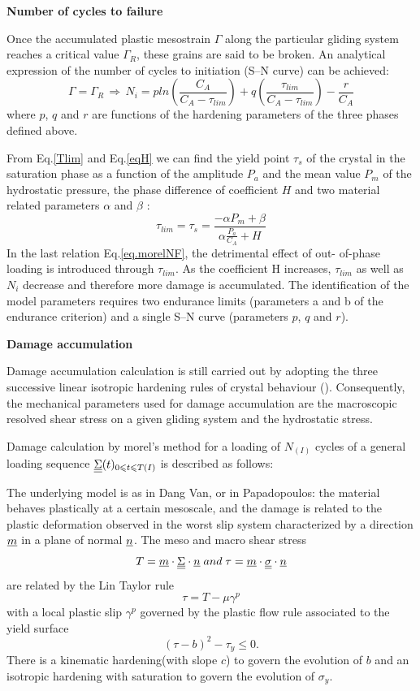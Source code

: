 \textbf{Number of cycles to failure}

Once the accumulated plastic mesostrain $\Gamma$ along the particular gliding system reaches a critical value $\Gamma_R$, these grains are said to be broken. An analytical expression of the number
of cycles to initiation (S–N curve) can be achieved:
\begin{equation}
\Gamma=\Gamma_R \, \Rightarrow \, N_i=pln\left(\frac{C_A}{C_A-\tau_{lim}}\right)+q\left(\frac{\tau_{lim}}{C_A-\tau_{lim}}\right)-\frac{r}{C_A}
\label{eq.morelNF}
\end{equation}
where $p$, $q$ and $r$ are functions of the hardening parameters of the three phases defined above.

From Eq.\eqref{Tlim} and Eq.\eqref{eqH} we can find the yield point $\tau_s$ of the crystal in the saturation phase as a function of the amplitude $P_a$ and the mean value $P_m$ of the hydrostatic pressure, the phase difference of coefficient $H$ and two material related parameters $\alpha$ and $\beta$ :
\begin{equation}
\tau_{lim}=\tau_s=\frac{-\alpha P_m+\beta}{\alpha\frac{P_a}{C_A}+H}
\label{taus}
\end{equation}
In the last relation Eq.\ref{eq.morelNF}, the detrimental effect of out-
of-phase loading is introduced through $\tau_{lim}$. As the coefficient H increases, $\tau_{lim}$ as well as $N_i$ decrease and therefore more damage is accumulated. The identification of
the model parameters requires two endurance limits
(parameters a and b of the endurance criterion) and a
single S–N curve (parameters $p$, $q$ and $r$).

\textbf{Damage accumulation}

Damage accumulation calculation is still carried out
by adopting the three successive linear isotropic hardening rules of crystal behaviour (). Consequently, the
mechanical parameters used for damage accumulation
are the macroscopic resolved shear stress on a given
gliding system and the hydrostatic stress.

Damage calculation by morel's method for a loading of $N_{(I)}$ cycles of a general loading sequence $\uline{\uline{\Sigma}}(t)_{0\leqslant t\leqslant T(I)}$ is described as follows:

The underlying model is as in Dang Van, or in Papadopoulos: the material behaves plastically at a certain mesoscale, and the damage is related to the plastic deformation observed in the worst slip system characterized by a direction $\uline{m}$ in a plane of normal $\uline{n}$. The meso and macro shear stress
$$T=\uline{m}\cdot \uline{\uline{\Sigma}}\cdot \uline{n} \; and \; \tau=\uline{m}\cdot \uline{\uline{\sigma}}\cdot \uline{n}$$
are related by the Lin Taylor rule
$$\tau=T-\mu\gamma^p$$
with a local plastic slip $\gamma^p$ governed by the plastic flow rule associated to the yield surface
$$(\tau-b)^2-\tau_y\leqslant 0.$$
There is a kinematic hardening(with slope $c$) to govern the evolution of $b$ and an isotropic hardening with saturation to govern the evolution of $\sigma_y$.

